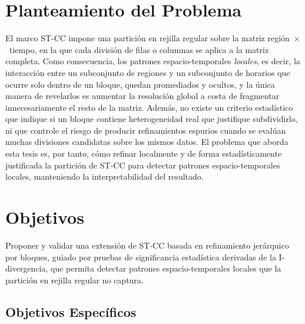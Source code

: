 \section{Planteamiento del Problema}
\label{sec:problema}

El marco \ac{ST-CC} impone una partición en rejilla regular sobre la matriz
región~$\times$~tiempo, en la que cada división de filas o columnas se
aplica a la matriz completa. Como consecuencia, los patrones
espacio-temporales \emph{locales}, es decir, la interacción entre un
subconjunto de regiones y un subconjunto de horarios que ocurre solo dentro
de un bloque, quedan promediados y ocultos, y la única manera de revelarlos
es aumentar la resolución global a costa de fragmentar innecesariamente el
resto de la matriz. Además, no existe un criterio estadístico que indique
si un bloque contiene heterogeneidad real que justifique subdividirlo, ni
que controle el riesgo de producir refinamientos espurios cuando se evalúan
muchas divisiones candidatas sobre los mismos datos. El problema que aborda
esta tesis es, por tanto, cómo refinar localmente y de forma
estadísticamente justificada la partición de \ac{ST-CC} para detectar
patrones espacio-temporales locales, manteniendo la interpretabilidad del
resultado.

\section{Objetivos}
\label{sec:objetivos}

Proponer y validar una extensión de \ac{ST-CC} basada en refinamiento
jerárquico por bloques, guiado por pruebas de significancia estadística
derivadas de la I-divergencia, que permita detectar patrones
espacio-temporales locales que la partición en rejilla regular no captura.

\subsection{Objetivos Específicos}
\label{subsec:objetivos-especificos}

